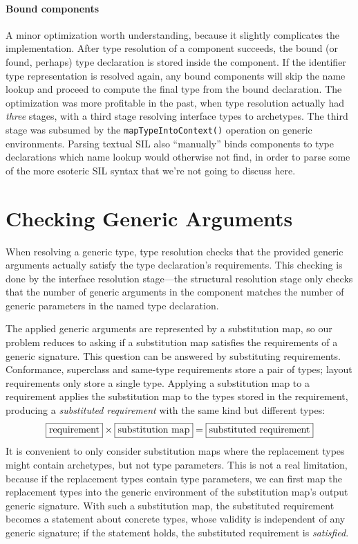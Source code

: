 \documentclass[a4paper,headsepline,bibliography=totoc,toc=flat,fleqn,twoside=semi]{scrbook}
\theoremstyle{definition}
\theoremstyle{definition}
\theoremstyle{definition}
\newcommand{\mathboxed}[1]{\boxed{\mbox{\vphantom{pI\texttt{pI}}#1}}}
\newcommand{\ifWIP}{\iffalse}
\begin{document}
\paragraph{Bound components} A minor optimization worth understanding, because it slightly complicates the implementation. After type resolution of a component succeeds, the bound (or found, perhaps) type declaration is stored inside the component. If the identifier type representation is resolved again, any bound components will skip the name lookup and proceed to compute the final type from the bound declaration. The optimization was more profitable in the past, when type resolution actually had \emph{three} stages, with a third stage resolving interface types to archetypes. The third stage was subsumed by the \texttt{mapTypeIntoContext()} operation on generic environments. Parsing textual SIL also ``manually'' binds components to type declarations which name lookup would otherwise not find, in order to parse some of the more esoteric SIL syntax that we're not going to discuss here.
\fi

\section{Checking Generic Arguments}\label{checking generic arguments}

\ifWIP
When resolving a generic type, type resolution checks that the provided generic arguments actually satisfy the type declaration's requirements. This checking is done by the interface resolution stage---the structural resolution stage only checks that the number of generic arguments in the component matches the number of generic parameters in the named type declaration.

The applied generic arguments are represented by a substitution map, so our problem reduces to asking if a substitution map satisfies the requirements of a generic signature. This question can be answered by substituting requirements. Conformance, superclass and same-type requirements store a pair of types; layout requirements only store a single type. Applying a substitution map to a requirement applies the substitution map to the types stored in the requirement, producing a \emph{substituted requirement} with the same kind but different types:
\[\mathboxed{requirement}\times\mathboxed{substitution map} = \mathboxed{substituted requirement}\]
It is convenient to only consider substitution maps where the replacement types might contain archetypes, but not type parameters. This is not a real limitation, because if the replacement types contain type parameters, we can first map the replacement types into the generic environment of the substitution map's output generic signature. With such a substitution map, the substituted requirement becomes a statement about concrete types, whose validity is independent of any generic signature; if the statement holds, the substituted requirement is \emph{satisfied}.
\end{document}
